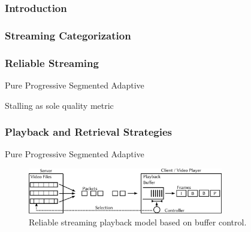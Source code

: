 \documentclass{beamer}
\begin{document}
\begin{frame}
	\frametitle{Introduction}
\end{frame}


\begin{frame}
	\frametitle{Streaming Categorization}
\end{frame}


\begin{frame}
	\frametitle{Reliable Streaming}

	Pure Progressive
	Segmented
	Adaptive

	Stalling as sole quality metric
\end{frame}



\begin{frame}
	\frametitle{Playback and Retrieval Strategies}

	Pure Progressive
	Segmented
	Adaptive
	\begin{figure}

	\includegraphics[height=2cm]{../../chapters/03-streaming/images/playback-model.pdf}
	\caption{Reliable streaming playback model based on buffer control.}
	\end{figure}

\end{frame}
\end{document}
